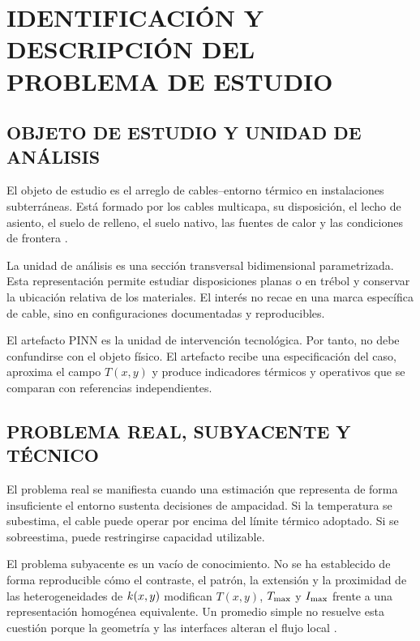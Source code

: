 \section{IDENTIFICACIÓN Y DESCRIPCIÓN DEL PROBLEMA DE ESTUDIO}
\label{sec:identificacion-problema}

\subsection{OBJETO DE ESTUDIO Y UNIDAD DE ANÁLISIS}

El objeto de estudio es el arreglo de cables--entorno térmico en instalaciones subterráneas. Está formado por los cables multicapa, su disposición, el lecho de asiento, el suelo de relleno, el suelo nativo, las fuentes de calor y las condiciones de frontera \parencites[3--6]{enescu2021}{ieee442}[1,10]{kim2025}.

La unidad de análisis es una sección transversal bidimensional parametrizada. Esta representación permite estudiar disposiciones planas o en trébol y conservar la ubicación relativa de los materiales. El interés no recae en una marca específica de cable, sino en configuraciones documentadas y reproducibles.

El artefacto PINN es la unidad de intervención tecnológica. Por tanto, no debe confundirse con el objeto físico. El artefacto recibe una especificación del caso, aproxima el campo $T(x,y)$ y produce indicadores térmicos y operativos que se comparan con referencias independientes.

\subsection{PROBLEMA REAL, SUBYACENTE Y TÉCNICO}

El problema real se manifiesta cuando una estimación que representa de forma insuficiente el entorno sustenta decisiones de ampacidad. Si la temperatura se subestima, el cable puede operar por encima del límite térmico adoptado. Si se sobreestima, puede restringirse capacidad utilizable.

El problema subyacente es un vacío de conocimiento. No se ha establecido de forma reproducible cómo el contraste, el patrón, la extensión y la proximidad de las heterogeneidades de $k(x,y)$ modifican $T(x,y)$, $T_{\max}$ y $I_{\max}$ frente a una representación homogénea equivalente. Un promedio simple no resuelve esta cuestión porque la geometría y las interfaces alteran el flujo local \parencites[4--6]{enescu2021}[3--4,93--99]{cigre2025}.

